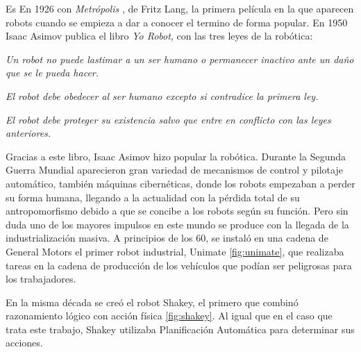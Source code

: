 Es En 1926  con \textit{Metrópolis} , de Fritz Lang, la primera película en la que aparecen robots cuando se empieza a dar a conocer el termino de forma popular.
En 1950 Isaac Asimov publica el libro \textit{Yo Robot}, con las tres leyes de la robótica:

\textit{Un robot no puede lastimar a un ser humano o permanecer inactivo ante un daño que se le pueda hacer.}

\textit{El robot debe obedecer al ser humano excepto si contradice la primera ley.}

\textit{El robot debe proteger su existencia salvo que entre en conflicto con las leyes anteriores.}

Gracias a este libro, Isaac Asimov hizo popular la robótica.
Durante la Segunda Guerra Mundial aparecieron gran variedad de
mecanismos de control y pilotaje automático, también máquinas cibernéticas, donde los robots empezaban a perder su forma humana, llegando a la actualidad con la pérdida total de su antropomorfismo debido a que se concibe a los robots según su función.
Pero sin duda uno de los mayores impulsos en este mundo se produce con la llegada de la industrialización masiva. A principios de los 60, se instaló en una cadena de General Motors el primer robot industrial, Unimate \ref{fig:unimate}, que realizaba tareas en la cadena de producción de los vehículos que podían ser peligrosas para los trabajadores.

En la misma década se creó el robot Shakey, el primero que combinó razonamiento lógico con acción física \ref{fig:shakey}. Al igual que en el caso que trata este trabajo, Shakey utilizaba Planificación Automática para determinar sus acciones.

